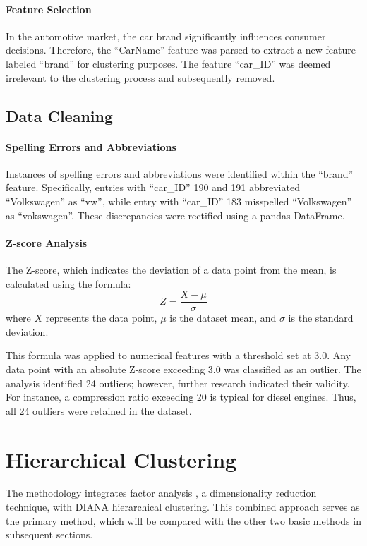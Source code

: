 \documentclass{article}
\begin{document}
\paragraph{Feature Selection}
In the automotive market, the car brand significantly influences consumer decisions.
Therefore, the ``CarName'' feature was parsed to extract a new feature labeled ``brand'' for clustering purposes.
The feature ``car\_ID'' was deemed irrelevant to the clustering process and subsequently removed.

\subsection{Data Cleaning}

\paragraph{Spelling Errors and Abbreviations}
Instances of spelling errors and abbreviations were identified within the ``brand'' feature.
Specifically, entries with ``car\_ID'' 190 and 191 abbreviated ``Volkswagen'' as ``vw'', while entry with ``car\_ID'' 183 misspelled ``Volkswagen'' as ``vokswagen''.
These discrepancies were rectified using a pandas DataFrame.

\paragraph{Z-score Analysis}
The Z-score, which indicates the deviation of a data point from the mean, is calculated using the formula:
\begin{equation}
    Z = \frac{X - \mu}{\sigma}
\end{equation}
where \( X \) represents the data point, \( \mu \) is the dataset mean, and \( \sigma \) is the standard deviation.

This formula was applied to numerical features with a threshold set at 3.0.
Any data point with an absolute Z-score exceeding 3.0 was classified as an outlier.
The analysis identified 24 outliers; however, further research indicated their validity.
For instance, a compression ratio exceeding 20 is typical for diesel engines.
Thus, all 24 outliers were retained in the dataset.

\section{Hierarchical Clustering}
The methodology integrates factor analysis \cite{Gorsuch1983}, a dimensionality reduction technique, with DIANA hierarchical clustering.
This combined approach serves as the primary method, which will be compared with the other two basic methods in subsequent sections.
\end{document}
